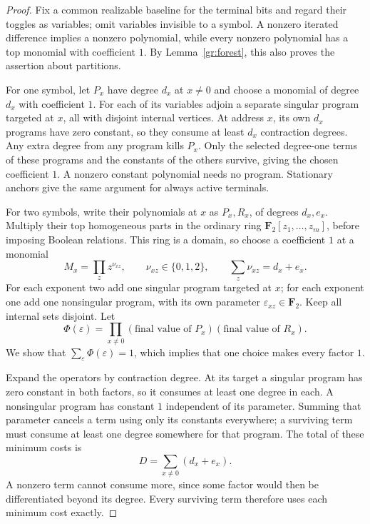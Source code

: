 \begin{proof}
Fix a common realizable baseline for the terminal bits and regard their
toggles as variables; omit variables invisible to a symbol.  A nonzero
iterated difference implies a nonzero polynomial, while every nonzero
polynomial has a top monomial with coefficient $1$.  By
Lemma~\ref{gr:forest}, this also proves the assertion about partitions.

For one symbol, let $P_x$ have degree $d_x$ at $x\ne0$ and choose a
monomial of degree $d_x$ with coefficient $1$.  For each of its variables
adjoin a separate singular program targeted at $x$, all with disjoint
internal vertices.  At address $x$, its own $d_x$ programs have zero
constant, so they consume at least $d_x$ contraction degrees.  Any extra
degree from any program kills $P_x$.  Only the selected degree-one terms
of these programs and the constants of the others survive, giving the
chosen coefficient $1$.  A nonzero constant polynomial needs no program.
Stationary anchors give the same argument for always active terminals.

For two symbols, write their polynomials at $x$ as $P_x,R_x$, of degrees
$d_x,e_x$.  Multiply their top homogeneous parts in the ordinary ring
$\mathbf F_2[z_1,\ldots,z_m]$, before imposing Boolean relations.
This ring is a domain, so choose a coefficient $1$ at a monomial
\begin{equation}\label{gr:chosen-monomial}
 M_x=\prod_z z^{\nu_{xz}},\qquad
 \nu_{xz}\in\{0,1,2\},\qquad
 \sum_z\nu_{xz}=d_x+e_x.
\end{equation}
For each exponent two add one singular program targeted at $x$; for
each exponent one add one nonsingular program, with its own parameter
$\varepsilon_{xz}\in\mathbf F_2$.  Keep all internal sets disjoint.
Let
\[
 \Phi(\varepsilon)=\prod_{x\ne0}
    (\text{final value of }P_x)(\text{final value of }R_x).
\]
We show that $\sum_\varepsilon\Phi(\varepsilon)=1$, which implies
that one choice makes every factor $1$.

Expand the operators by contraction degree.  At its target a singular
program has zero constant in both factors, so it consumes at least one
degree in each.  A nonsingular program has constant $1$ independent of
its parameter.  Summing that parameter cancels a term using only its
constants everywhere; a surviving term must consume at least one degree
somewhere for that program.  The total of these minimum costs is
\begin{equation}\label{gr:budget}
 D=\sum_{x\ne0}(d_x+e_x).
\end{equation}
A nonzero term cannot consume more, since some factor would then be
differentiated beyond its degree.  Every surviving term therefore uses
each minimum cost exactly.


\end{proof}
